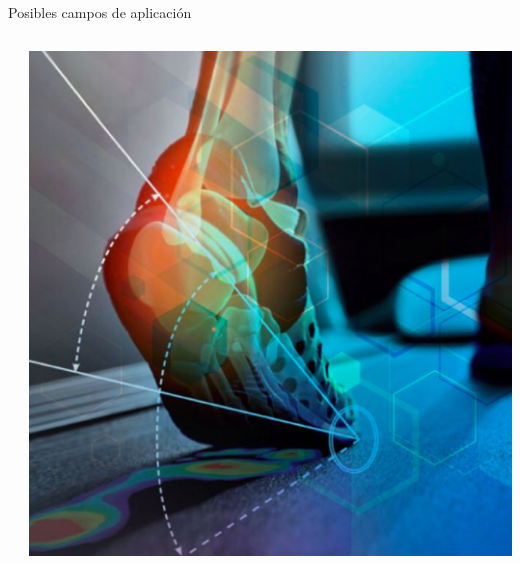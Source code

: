 \documentclass{bredelebeamer}
\begin{document}
\begin{frame}{Posibles campos de aplicación}
\begin{columns}
\begin{column}{0.3\textwidth}
\end{column}
\begin{column}{0.3\textwidth}
\begin{center}
\includegraphics[scale=0.19]{images/ap3.png}\\
\end{center}
\end{column}
\end{columns}
\end{frame}
\end{document}
